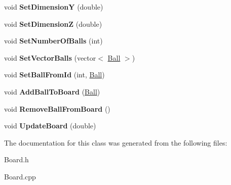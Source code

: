 \begin{DoxyCompactItemize}
\item 
\hypertarget{classBoard_ac370e9c8e7abcdc0be8d9f4e0e5a3306}{void {\bfseries Set\+Dimension\+Y} (double)}\label{classBoard_ac370e9c8e7abcdc0be8d9f4e0e5a3306}

\item 
\hypertarget{classBoard_a5fa6bd2aaf89395612d609aef15f3e0c}{void {\bfseries Set\+Dimension\+Z} (double)}\label{classBoard_a5fa6bd2aaf89395612d609aef15f3e0c}

\item 
\hypertarget{classBoard_abf2f2750ff34813b72a3b7642ad592d2}{void {\bfseries Set\+Number\+Of\+Balls} (int)}\label{classBoard_abf2f2750ff34813b72a3b7642ad592d2}

\item 
\hypertarget{classBoard_adc03b83ba8b8a268f5e5498f65f18e0d}{void {\bfseries Set\+Vector\+Balls} (vector$<$ \hyperlink{classBall}{Ball} $>$)}\label{classBoard_adc03b83ba8b8a268f5e5498f65f18e0d}

\item 
\hypertarget{classBoard_aef6af921107ced16387ae844eaee7cf6}{void {\bfseries Set\+Ball\+From\+Id} (int, \hyperlink{classBall}{Ball})}\label{classBoard_aef6af921107ced16387ae844eaee7cf6}

\item 
\hypertarget{classBoard_ae6bdd398db4c50fb6b6598aedb267dc4}{void {\bfseries Add\+Ball\+To\+Board} (\hyperlink{classBall}{Ball})}\label{classBoard_ae6bdd398db4c50fb6b6598aedb267dc4}

\item 
\hypertarget{classBoard_ac1e5115cbbf774b92c68c1dc1b1ffb45}{void {\bfseries Remove\+Ball\+From\+Board} ()}\label{classBoard_ac1e5115cbbf774b92c68c1dc1b1ffb45}

\item 
\hypertarget{classBoard_af19eeae45cb4bf01b8e65f5c242d151e}{void {\bfseries Update\+Board} (double)}\label{classBoard_af19eeae45cb4bf01b8e65f5c242d151e}

\end{DoxyCompactItemize}


The documentation for this class was generated from the following files\+:\begin{DoxyCompactItemize}
\item 
Board.\+h\item 
Board.\+cpp\end{DoxyCompactItemize}
